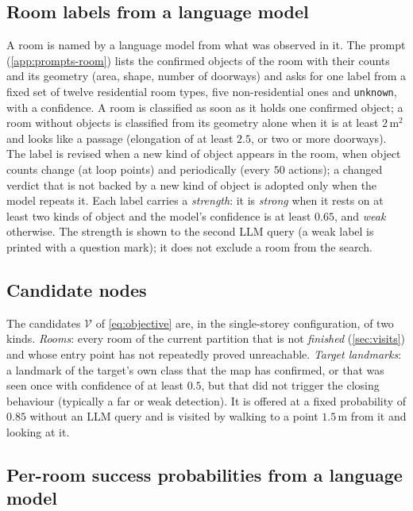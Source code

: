 \documentclass[10pt]{article}
\newcommand{\code}[1]{\texttt{#1}}
\newcommand{\m}{\,\mathrm{m}}
\newcommand{\sqm}{\,\mathrm{m}^2}
\newcommand{\Nodes}{\mathcal{V}}
\begin{document}
\subsection{Room labels from a language model}\label{sec:labels}
A room is named by a language model from what was observed in it. The prompt
(\cref{app:prompts-room}) lists the confirmed objects of the room with their
counts and its geometry (area, shape, number of doorways) and asks for one
label from a fixed set of twelve residential room types, five non-residential
ones and \code{unknown}, with a confidence. A room is classified as soon as it
holds one confirmed object; a room without objects is classified from its
geometry alone when it is at least $2\sqm$ and looks like a passage (elongation
of at least $2.5$, or two or more doorways). The label is revised when a new
kind of object appears in the room, when object counts change (at loop points)
and periodically (every $50$ actions); a changed verdict that is not backed by
a new kind of object is adopted only when the model repeats it. Each label
carries a \emph{strength}: it is \emph{strong} when it rests on at least two
kinds of object and the model's confidence is at least $0.65$, and
\emph{weak} otherwise. The strength is shown to the second LLM query (a weak
label is printed with a question mark); it does not exclude a room from the
search.

\subsection{Candidate nodes}\label{sec:nodes}
The candidates $\Nodes$ of \cref{eq:objective} are, in the single-storey
configuration, of two kinds.
\emph{Rooms}: every room of the current partition that is not \emph{finished}
(\cref{sec:visits}) and whose entry point has not repeatedly proved
unreachable.
\emph{Target landmarks}: a landmark of the target's own class that the map has
confirmed, or that was seen once with confidence of at least $0.5$, but that
did not trigger the closing behaviour (typically a far or weak detection). It
is offered at a fixed probability of $0.85$ without an LLM query and is visited
by walking to a point $1.5\m$ from it and looking at it.

\subsection{Per-room success probabilities from a language model}\label{sec:oracle}
\end{document}
